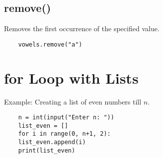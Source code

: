 \subsection{remove()}
Removes the first occurrence of the specified value.
\begin{verbatim}
	vowels.remove("a")
\end{verbatim}

\section{for Loop with Lists}
\noindent Example: Creating a list of even numbers till $n$.
\begin{verbatim}
	n = int(input("Enter n: "))
	list_even = []
	for i in range(0, n+1, 2):
	list_even.append(i)
	print(list_even)
\end{verbatim}